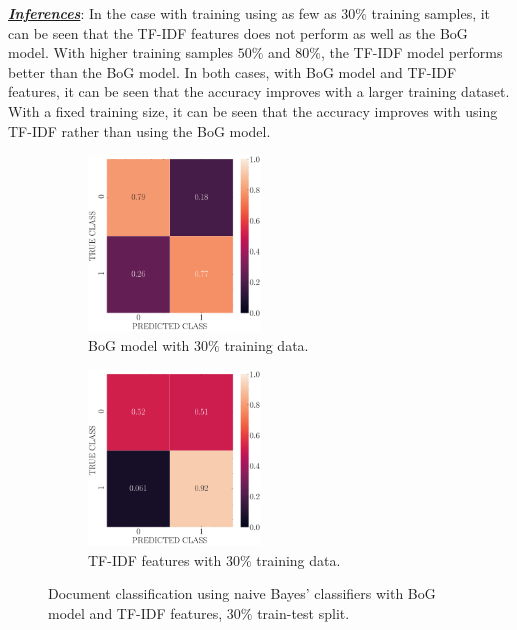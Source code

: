 \documentclass[12pt, a4 paper]{article}
\begin{document}
\underline {\it \bfseries Inferences}: In the case with training using as few as $30\%$ training samples, it can be seen that the TF-IDF features does not perform as well as the BoG model. With higher training samples $50\%$ and $80\%$, the TF-IDF model performs better than the BoG model. In both cases, with BoG model and TF-IDF features, it can be seen that the accuracy improves with a larger training dataset. With a fixed training size, it can be seen that the accuracy improves with using TF-IDF rather than using the BoG model. \\
\begin{figure}[!htbp]
\centering
    \begin{subfigure}[!htbp]{0.24\textwidth}
       \centering
       \includegraphics[width=1.8in]{../results/ex4/conf_mtx_bog_train_test_split_0.7.pdf}
       \caption{BoG model with $30\%$ training data.}
       \label{fig:bog_30}
    \end{subfigure}
\quad \quad
    \begin{subfigure}[!htbp]{0.24\textwidth}
       \centering
       \includegraphics[width=1.8in]{../results/ex4/conf_mtx_tfidf_train_test_split_0.7.pdf}
       \caption{TF-IDF features with $30\%$ training data.}
       \label{fig:tfidf_50}
    \end{subfigure}
\caption{Document classification using naive Bayes' classifiers with BoG model and TF-IDF features, $30\%$ train-test split.}
\label{fig:ex4_30}
\end{figure}
\end{document}
